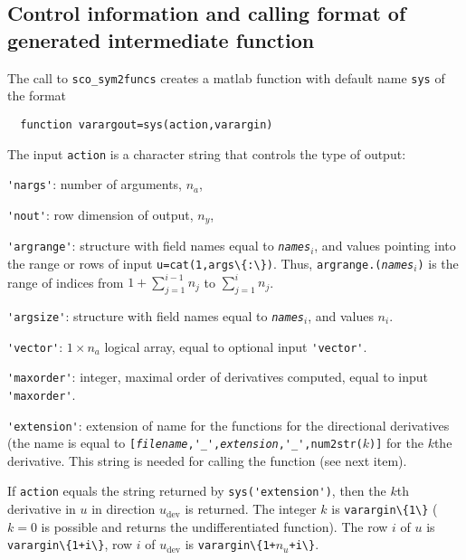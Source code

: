 \documentclass[11pt]{scrartcl}
\newcommand{\blist}[1]{\mbox{\lstinline!#1!}}
\newcommand{\genvar}[1]{\textit{\texttt{#1}}}
\begin{document}
\subsection{Control information and calling format of generated
  intermediate function}
\label{sec:intermediate}
The call to \blist{sco_sym2funcs} creates a matlab function with default name \blist{sys} of the format
\begin{lstlisting}
  function varargout=sys(action,varargin)
\end{lstlisting}
The input \blist{action} is a character string that controls the type of output:
\begin{compactitem}
\item \blist{'nargs'}: number of arguments, $n_a$,
\item \blist{'nout'}: row dimension of output, $n_y$,
\item \blist{'argrange'}: structure with field names equal to
  \genvar{names}$_i$, and values pointing into the range or rows of
  input \blist{u=cat(1,args\{:\})}. Thus,
  \blist{argrange.(}\genvar{names}$_i$\blist{)} is the range of
  indices from $1+\sum_{j=1}^{i-1}n_j$ to $\sum_{j=1}^in_j$.
\item \blist{'argsize'}: structure with field names equal to
  \genvar{names}$_i$, and values $n_i$.
\item \blist{'vector'}: $1\times n_a$ logical array, equal to optional
  input \blist{'vector'}.
\item \blist{'maxorder'}: integer, maximal order of derivatives
  computed, equal to input \blist{'maxorder'}.
\item \blist{'extension'}: extension of name for the functions for the
  directional derivatives (the name is equal to
  \blist{[}\genvar{filename}\blist{,'_',}\genvar{extension}\blist{,'_',num2str(}$k$\blist{)]}
  for the $k$the derivative. This string is needed for calling the function (see next item).
\item If \blist{action} equals the string returned by
  \blist{sys('extension')}, then the $k$th derivative in $u$
  in direction $u_\mathrm{dev}$ is returned. The integer $k$ is
  \blist{varargin\{1\}} ($k=0$ is possible and returns the
  undifferentiated function). The row $i$ of $u$ is
  \blist{varargin\{1+i\}}, row $i$ of $u_\mathrm{dev}$ is
  \blist{varargin\{1+}$n_u$\blist{+i\}}.
\end{compactitem}
\end{document}
